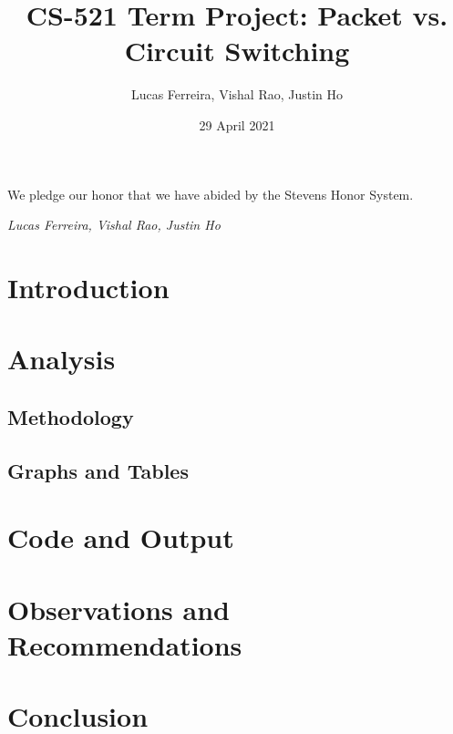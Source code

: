 \documentclass{article}
\title{CS-521 Term Project: Packet vs. Circuit Switching}
\author{Lucas Ferreira, Vishal Rao, Justin Ho}
\date{29 April 2021}
\begin{document}
  \maketitle

  {\flushleft We pledge our honor that we have abided by the Stevens Honor System.

  \textit{Lucas Ferreira, Vishal Rao, Justin Ho}}

  \section{Introduction}



  \section{Analysis}

  \subsection*{Methodology}

  \subsection*{Graphs and Tables}



  \section{Code and Output}



  \section{Observations and Recommendations}



  \section{Conclusion}
\end{document}
